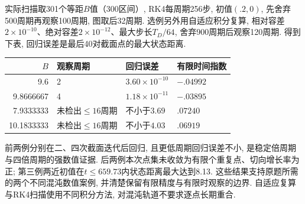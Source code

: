 实际扫描取301个等距$B$值（300区间）, RK4每周期256步, 初值$(.2,0)$, 先舍弃500周期再观察100周期, 图取后32周期. 选例另外用自适应积分复算, 相对容差$2\times10^{-10}$、绝对容差$2\times10^{-12}$、最大步长$T_D/64$, 舍弃900周期后观察120周期. 得到下表, 回归误差是最后40对截面点的最大状态距离.
\begin{center}
\begin{tabular}{rlll}
\toprule $B$ & 观察周期 & 回归误差 & 有限时间指数\\\midrule
9.6 & 2 & $3.60\times10^{-10}$ & $-.04992$\\
9.8666667 & 4 & $1.18\times10^{-11}$ & $-.03895$\\
7.9333333 & 未检出$\le16$周期 & 不小于$3.69$ & $.07240$\\
10.1833333 & 未检出$\le16$周期 & 不小于$4.03$ & $.06919$\\\bottomrule
\end{tabular}
\end{center}
前两例分别在二、四次截面迭代后回归, 且更低周期回归误差不小, 是稳定倍周期与四倍周期的强数值证据. 后两例本次点集未收敛为有限个重复点、切向增长率为正; 第三例两近初值在$t\le659.73$内状态距离最大达到8.13. 这些结果支持原题所需的两个不同混沌数值案例, 并清楚保留有限精度与有限时观察的边界. 自适应复算与RK4扫描使用不同积分方法, 对混沌轨道不要求逐点长期重合.
